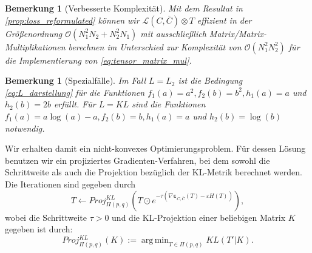 \documentclass[11pt,a4paper]{article}
\DeclareMathOperator*{\argmin}{arg\,min}
\newtheorem{remark}[theorem]{Bemerkung}
\numberwithin{equation}{section}
\begin{document}
	
	\begin{remark}[Verbesserte Komplexität]
		Mit dem Resultat in \autoref{prop:loss_reformulated} können wir $\mathcal{L} (C,\bar{C}) \otimes T$ effizient in der Größenordnung $\mathcal{O}(N_1^2N_2 + N_2^2N_1)$ mit ausschließlich Matrix/Matrix-Multiplikationen berechnen im Unterschied zur Komplexität von $\mathcal{O}(N_1^2N_2^2)$ für die Implementierung von \autoref{eq:tensor_matrix_mul}.
	\end{remark}
	
	\begin{remark}[Spezialfälle]
		Im Fall $L=L_2$ ist die Bedingung \autoref{eq:L_darstellung} für die Funktionen $f_1(a) = a^2, f_2(b) = b^2, h_1(a) = a$ und $h_2(b) = 2b$ erfüllt.
		Für $L=KL$ sind die Funktionen $f_1(a) = a \log (a) -a, f_2(b) = b, h_1(a) =a $ und $h_2(b) = \log (b)$ notwendig.
	\end{remark}
	
	
	
	
	
	Wir erhalten damit ein nicht-konvexes Optimierungsproblem. Für dessen Lösung benutzen wir ein projiziertes Gradienten-Verfahren, bei dem sowohl die Schrittweite als auch die Projektion bezüglich der KL-Metrik berechnet werden.\\
	
	Die Iterationen sind gegeben durch
	\begin{equation}
	T \leftarrow Proj_{\Pi(p,q)}^{KL} \left(T \odot e^{-\tau( \nabla \boldsymbol{\varepsilon}_{C, \bar{C}}(T) -\varepsilon H(T))} \right), \label{iteration_projection}
	\end{equation}
	wobei die Schrittweite $\tau > 0$ und die KL-Projektion einer beliebigen Matrix $K$ gegeben ist durch:
	\begin{equation}
	Proj_{\Pi(p,q)}^{KL}(K) := \argmin_{T \in \Pi (p,q)} KL(T'|K).
	\end{equation}
	
\end{document}
